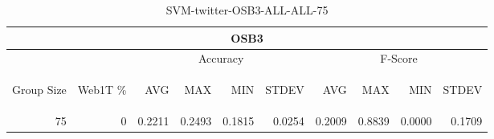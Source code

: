 \begin{center}
\begin{table}[htbp] 
 \begin{center}
\begin{tabular}{ | r | r | r | r | r | r | r | r | r | r |}
\hline
\multicolumn{10}{|c|}{OSB3}\\
\hline
 & & \multicolumn{4}{|c|}{Accuracy} & \multicolumn{4}{|c|}{F-Score}\\ \cline{3-10}
\begin{sideways}Group Size\end{sideways} & \begin{sideways}Web1T \%\end{sideways} & \begin{sideways}AVG\end{sideways} & \begin{sideways}MAX\end{sideways} & \begin{sideways}MIN\end{sideways} & \begin{sideways}STDEV\end{sideways} & \begin{sideways}AVG\end{sideways} & \begin{sideways}MAX\end{sideways} & \begin{sideways}MIN\end{sideways} & \begin{sideways}STDEV\end{sideways}\\
\hline
\multirow{0}{*}{75}
 & 0 & 0.2211 & 0.2493 & 0.1815 & 0.0254 & 0.2009 & 0.8839 & 0.0000 & 0.1709\\ \cline{2-10}
\hline
\end{tabular}
\caption{SVM-twitter-OSB3-ALL-ALL-75}
\label{table:SVM-twitter-OSB3-ALL-ALL-75}
\end{center}
 \end{table}
\end{center}

